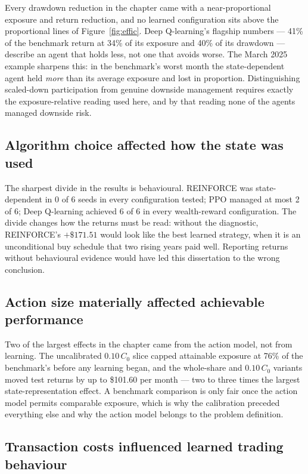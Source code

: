 Every drawdown reduction in the chapter came with a near-proportional
exposure and return reduction, and no learned configuration sits above the
proportional lines of Figure~\ref{fig:effic}. Deep Q-learning's flagship
numbers --- 41\% of the benchmark return at 34\% of its exposure and 40\%
of its drawdown --- describe an agent that holds less, not one that avoids
worse. The March 2025 example sharpens this: in the benchmark's worst
month the state-dependent agent held \emph{more} than its average exposure
and lost in proportion. Distinguishing scaled-down participation from
genuine downside management requires exactly the exposure-relative reading
used here, and by that reading none of the agents managed downside risk.

\subsection{Algorithm choice affected how the state was used}

The sharpest divide in the results is behavioural. REINFORCE was
state-dependent in 0 of 6 seeds in every configuration tested; PPO managed
at most 2 of 6; Deep Q-learning achieved 6 of 6 in every wealth-reward
configuration. The divide changes how the returns must be read: without
the diagnostic, REINFORCE's $+\$171.51$ would look like the best learned
strategy, when it is an unconditional buy schedule that two rising years
paid well. Reporting returns without behavioural evidence would have led
this dissertation to the wrong conclusion.

\subsection{Action size materially affected achievable performance}

Two of the largest effects in the chapter came from the action model, not
from learning. The uncalibrated $0.10\,C_0$ slice capped attainable
exposure at 76\% of the benchmark's before any learning began, and the
whole-share and $0.10\,C_0$ variants moved test returns by up to \$101.60
per month --- two to three times the largest state-representation effect.
A benchmark comparison is only fair once the action model permits
comparable exposure, which is why the calibration preceded everything else
and why the action model belongs to the problem definition.

\subsection{Transaction costs influenced learned trading behaviour}

